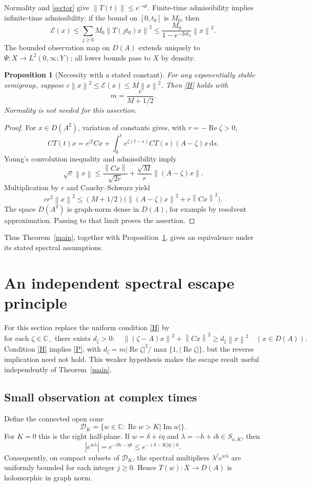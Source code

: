 \documentclass[11pt,a4paper]{article}
\newtheorem{proposition}[theorem]{Proposition}
\theoremstyle{definition}\newtheorem{definition}[theorem]{Definition}
\theoremstyle{remark}\newtheorem{remark}[theorem]{Remark}
\newcommand{\C}{\mathbb C}\newcommand{\R}{\mathbb R}\newcommand{\N}{\mathbb N}
\newcommand{\E}{\mathcal E}\newcommand{\D}{\mathcal D}
\newcommand{\dd}{\,\mathrm d}
\DeclareMathOperator{\Rea}{Re}\DeclareMathOperator{\Ima}{Im}
\newcommand{\norm}[1]{\left\lVert #1\right\rVert}
\begin{document}
Normality and \eqref{sector} give $\norm{T(t)}\le e^{-at}$. Finite-time admissibility implies infinite-time admissibility: if the bound on $[0,t_0]$ is $M_0$, then
\[
 \E(x)\le\sum_{j\ge0}M_0\norm{T(jt_0)x}^2
 \le\frac{M_0}{1-e^{-2at_0}}\norm{x}^2.
\]
The bounded observation map on $D(A)$ extends uniquely to $\Psi:X\to L^2(0,\infty;Y)$; all lower bounds pass to $X$ by density.

\begin{proposition}[Necessity with a stated constant]\label{necessity}
For any exponentially stable semigroup, suppose $c\norm{x}^2\le\E(x)\le M\norm{x}^2$. Then \eqref{H} holds with
\[
 m=\frac{c}{M+1/2}.
\]
Normality is not needed for this assertion.
\end{proposition}
\begin{proof}
For $x\in D(A^2)$, variation of constants gives, with $r=-\Rea\zeta>0$,
\[
 CT(t)x=e^{\zeta t}Cx+
 \int_0^t e^{\zeta(t-s)}CT(s)(A-\zeta)x\dd s.
\]
Young's convolution inequality and admissibility imply
\[
 \sqrt c\norm{x}\le\frac{\norm{Cx}}{\sqrt{2r}}
 +\frac{\sqrt M}{r}\norm{(A-\zeta)x}.
\]
Multiplication by $r$ and Cauchy--Schwarz yield
\[
 c r^2\norm{x}^2\le (M+1/2)
 \bigl(\norm{(A-\zeta)x}^2+r\norm{Cx}^2\bigr).
\]
The space $D(A^2)$ is graph-norm dense in $D(A)$, for example by resolvent approximation. Passing to that limit proves the assertion.
\end{proof}
Thus Theorem~\ref{main}, together with Proposition~\ref{necessity}, gives an equivalence under its stated spectral assumptions.

\section{An independent spectral escape principle}\label{sec:escape}
For this section replace the uniform condition \eqref{H} by
\begin{equation}\label{P}\tag{P}
 \text{for each }\zeta\in\C_-\text{ there exists }d_\zeta>0:\quad
 \norm{(\zeta-A)x}^2+\norm{Cx}^2\ge d_\zeta\norm{x}^2
 \quad(x\in D(A)).
\end{equation}
Condition \eqref{H} implies \eqref{P}, with
$d_\zeta=m|\Rea\zeta|^2/\max\{1,|\Rea\zeta|\}$, but the reverse implication need not hold. This weaker hypothesis makes the escape result useful independently of Theorem~\ref{main}.

\subsection{Small observation at complex times}
Define the connected open cone
\[
 \D_K=\{w\in\C:\Rea w>K|\Ima w|\}.
\]
For $K=0$ this is the right half-plane. If $w=\delta+i\eta$ and $\lambda=-h+ib\in S_{a,K}$, then
\[
 |e^{w\lambda}|=e^{-\delta h-\eta b}
 \le e^{-(\delta-K|\eta|)h}.
\]
Consequently, on compact subsets of $\D_K$, the spectral multipliers $\lambda^j e^{w\lambda}$ are uniformly bounded for each integer $j\ge0$. Hence $T(w):X\to D(A)$ is holomorphic in graph norm.
\end{document}
